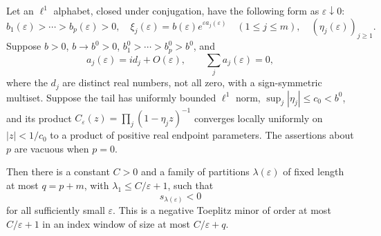 \begin{lemma}
\label{lem:analytic-cluster-Schur-witness}
Let an $\ell^1$ alphabet, closed under conjugation, have the following
form as $\varepsilon\downarrow0$:
\[
 b_1(\varepsilon)>\cdots>b_p(\varepsilon)>0,\quad
 \xi_j(\varepsilon)=b(\varepsilon)
                  e^{\varepsilon a_j(\varepsilon)}\quad(1\le j\le m),
                       \quad (\eta_j(\varepsilon))_{j\ge1}.
\]
Suppose $b>0$, $b\to b^0>0$,
$b_1^0>\cdots>b_p^0>b^0$, and
\[
 a_j(\varepsilon)=i d_j+O(\varepsilon),\qquad
 \sum_j a_j(\varepsilon)=0,
\]
where the $d_j$ are distinct real numbers, not all zero, with a
sign-symmetric multiset. Suppose the tail has uniformly bounded
$\ell^1$ norm, $\sup_j|\eta_j|\le c_0<b^0$, and its product
$C_\varepsilon(z)=\prod_j(1-\eta_jz)^{-1}$ converges locally uniformly
on $|z|<1/c_0$ to a product of positive real endpoint parameters.
The assertions about $p$ are vacuous when $p=0$.

Then there is a constant $C>0$ and a family of partitions
$\lambda(\varepsilon)$ of fixed length at most $q=p+m$, with
$\lambda_1\le C/\varepsilon+1$, such that
\[
                        s_{\lambda(\varepsilon)}<0
\]
for all sufficiently small $\varepsilon$. This is a negative
Toeplitz minor of order at most $C/\varepsilon+1$ in an index
window of size at most $C/\varepsilon+q$.
\end{lemma}

